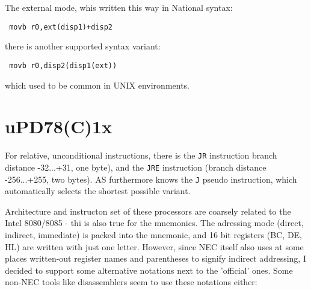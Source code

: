 \documentclass[12pt,twoside]{report}
\newcommand{\tty}[1]{{\tt #1}}
\newcommand{\asname}{{AS}}
\begin{document}
The external mode, whis written this way in National syntax:
\begin{verbatim}
 movb r0,ext(disp1)+disp2
\end{verbatim}
there is another supported syntax variant:
\begin{verbatim}
 movb r0,disp2(disp1(ext))
\end{verbatim}
which used to be common in UNIX environments.


\section{uPD78(C)1x}
\label{78C1xSpec}

For relative, unconditional instructions, there is the \tty{JR} instruction
branch distance -32...+31, one byte), and the \tty{JRE} instruction (branch
distance -256...+255, two bytes).  \asname{} furthermore knows the \tty{J} pseudo
instruction, which automatically selects the shortest possible variant.

Architecture and instructon set of these processors are coarsely
related to the Intel 8080/8085 - thi is also true for the
mnemonics.  The adressing mode (direct, indirect, immediate) is
packed into the mnemonic, and 16 bit registers (BC, DE, HL) are
written with just one letter.  However, since NEC itself also
uses at some places written-out register names and parentheses to
signify indirect addressing, I decided to support some
alternative notations next to the 'official' ones.   Some non-NEC
tools like disassemblers seem to use these notations either:
\end{document}
